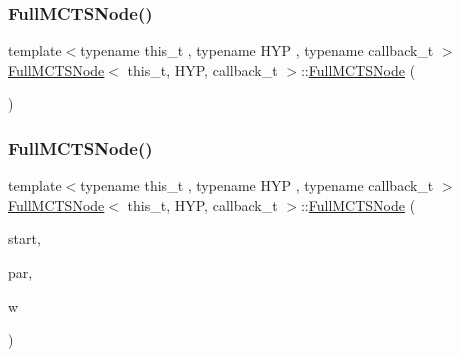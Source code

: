 \subsubsection{\texorpdfstring{Full\+M\+C\+T\+S\+Node()}{FullMCTSNode()}\hspace{0.1cm}{\footnotesize\ttfamily [1/5]}}
{\footnotesize\ttfamily template$<$typename this\+\_\+t , typename H\+YP , typename callback\+\_\+t $>$ \\
\hyperlink{class_full_m_c_t_s_node}{Full\+M\+C\+T\+S\+Node}$<$ this\+\_\+t, H\+YP, callback\+\_\+t $>$\+::\hyperlink{class_full_m_c_t_s_node}{Full\+M\+C\+T\+S\+Node} (\begin{DoxyParamCaption}{ }\end{DoxyParamCaption})\hspace{0.3cm}{\ttfamily [inline]}}

\mbox{\label{class_full_m_c_t_s_node_af3859089eca5e60735212c979edd1bac}} 
\subsubsection{\texorpdfstring{Full\+M\+C\+T\+S\+Node()}{FullMCTSNode()}\hspace{0.1cm}{\footnotesize\ttfamily [2/5]}}
{\footnotesize\ttfamily template$<$typename this\+\_\+t , typename H\+YP , typename callback\+\_\+t $>$ \\
\hyperlink{class_full_m_c_t_s_node}{Full\+M\+C\+T\+S\+Node}$<$ this\+\_\+t, H\+YP, callback\+\_\+t $>$\+::\hyperlink{class_full_m_c_t_s_node}{Full\+M\+C\+T\+S\+Node} (\begin{DoxyParamCaption}\item[{H\+YP \&}]{start,  }\item[{this\+\_\+t $\ast$}]{par,  }\item[{size\+\_\+t}]{w }\end{DoxyParamCaption})\hspace{0.3cm}{\ttfamily [inline]}}

\mbox{\label{class_full_m_c_t_s_node_a92cfc5d971a4aa3b17cd8cc5f36424d6}} 
